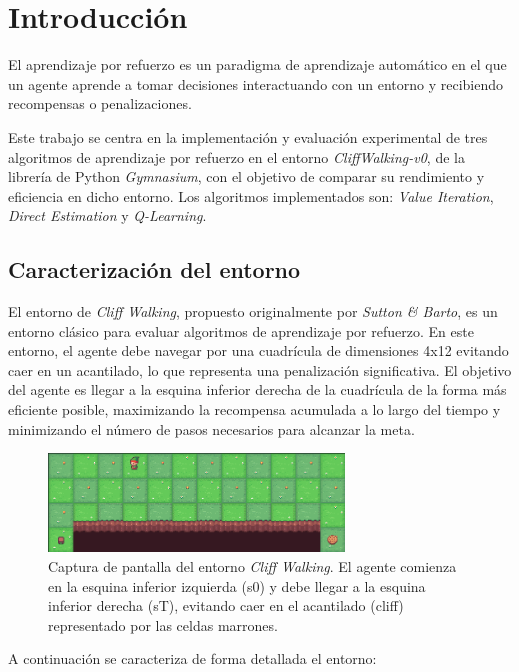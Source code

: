 \section{Introducción}

El aprendizaje por refuerzo es un paradigma de aprendizaje automático en el que un agente aprende a tomar decisiones interactuando con un entorno y recibiendo recompensas o penalizaciones.

Este trabajo se centra en la implementación y evaluación experimental de tres algoritmos de aprendizaje por refuerzo en el entorno \textit{CliffWalking-v0}, de la librería de Python \textit{Gymnasium}, con el objetivo de comparar su rendimiento y eficiencia en dicho entorno. Los algoritmos implementados son: \textit{Value Iteration}, \textit{Direct Estimation} y \textit{Q-Learning}.

\subsection{Caracterización del entorno}

El entorno de \textit{Cliff Walking}, propuesto originalmente por \textit{Sutton \& Barto}, es un entorno clásico para evaluar algoritmos de aprendizaje por refuerzo. En este entorno, el agente debe navegar por una cuadrícula de dimensiones 4x12 evitando caer en un acantilado, lo que representa una penalización significativa. El objetivo del agente es llegar a la esquina inferior derecha de la cuadrícula de la forma más eficiente posible, maximizando la recompensa acumulada a lo largo del tiempo y minimizando el número de pasos necesarios para alcanzar la meta.

\begin{figure}[h]
    \centering
    \includegraphics[width=0.7\textwidth]{images/mapa.png}
    \caption{Captura de pantalla del entorno \textit{Cliff Walking}. El agente comienza en la esquina inferior izquierda (s0) y debe llegar a la esquina inferior derecha (sT), evitando caer en el acantilado (cliff) representado por las celdas marrones.}
    \label{fig:cliff-walking-map}
\end{figure}

A continuación se caracteriza de forma detallada el entorno:

